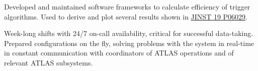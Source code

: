 
\begin{cventries}
    {Developed and maintained software frameworks to calculate efficiency of trigger algorithms. Used to derive and plot several results shown in \href{https://doi.org/10.1088/1748-0221/19/06/P06029}{JINST 19 P06029}.}

    {Week-long shifts with 24/7 on-call availability, critical for successful data-taking. Prepared configurations on the fly, solving problems with the system in real-time in constant communication with coordinators of ATLAS operations and of relevant ATLAS subsystems.}


\end{cventries}